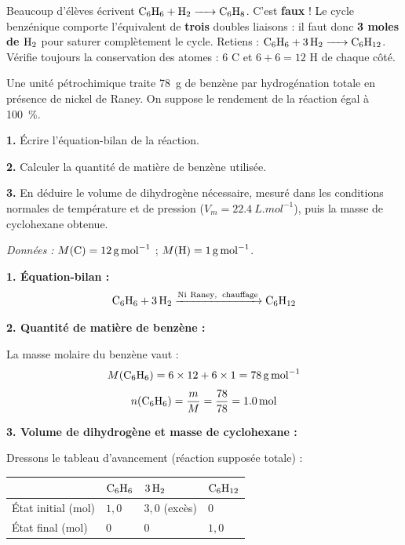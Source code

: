 \documentclass[11pt]{article}
\begin{document}
\begin{attention}
Beaucoup d'élèves écrivent $\ce{C6H6 + H2 -> C6H8}$. C'est \textbf{faux} ! Le cycle benzénique comporte l'équivalent de \textbf{trois} doubles liaisons : il faut donc \textbf{3 moles de $\ce{H2}$} pour saturer complètement le cycle. Retiens : $\ce{C6H6 + 3 H2 -> C6H12}$. Vérifie toujours la conservation des atomes : 6 C et $6 + 6 = 12$ H de chaque côté.
\end{attention}

\begin{exoresolu}
Une unité pétrochimique traite \SI{78}{g} de benzène par hydrogénation totale en présence de nickel de Raney. On suppose le rendement de la réaction égal à \SI{100}{\%}.

\textbf{1.} Écrire l'équation-bilan de la réaction.

\textbf{2.} Calculer la quantité de matière de benzène utilisée.

\textbf{3.} En déduire le volume de dihydrogène nécessaire, mesuré dans les conditions normales de température et de pression ($V_m = \SI{22,4}{L.mol^{-1}}$), puis la masse de cyclohexane obtenue.

\emph{Données :} $M(\ce{C}) = \SI{12}{g.mol^{-1}}$ ; $M(\ce{H}) = \SI{1}{g.mol^{-1}}$.

\tcblower

\textbf{1. Équation-bilan :}
\[ \ce{C6H6 + 3 H2 ->[Ni\ Raney,\ \text{chauffage}] C6H12} \]

\textbf{2. Quantité de matière de benzène :}

La masse molaire du benzène vaut :
\[ M(\ce{C6H6}) = 6 \times 12 + 6 \times 1 = \SI{78}{g.mol^{-1}} \]
\[ n(\ce{C6H6}) = \frac{m}{M} = \frac{78}{78} = \SI{1,0}{mol} \]

\textbf{3. Volume de dihydrogène et masse de cyclohexane :}

Dressons le tableau d'avancement (réaction supposée totale) :

\begin{center}
\begin{tabularx}{\linewidth}{|l|X|X|X|}
\hline
\rowcolor{popblueL} & $\ce{C6H6}$ & $\ce{3 H2}$ & $\ce{C6H12}$ \\
\hline
État initial (mol) & $1{,}0$ & $3{,}0$ (excès) & $0$ \\
\hline
État final (mol) & $0$ & $0$ & $1{,}0$ \\
\hline
\end{tabularx}
\end{center}


\end{exoresolu}
\end{document}
